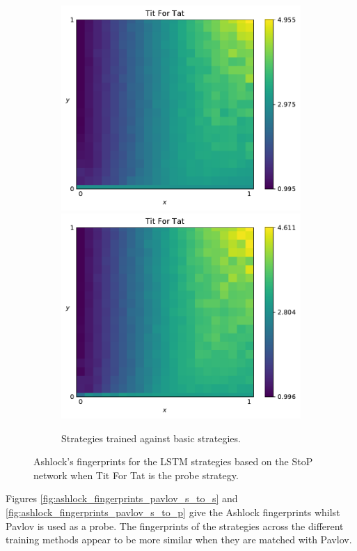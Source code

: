 \begin{figure}[!htbp]
\begin{subfigure}{\textwidth}
        \includegraphics[width=.3\textwidth]{src/chapters/07/img/tit_for_tat_basic_classification_1.pdf}
        \includegraphics[width=.3\textwidth]{src/chapters/07/img/tit_for_tat_basic_classification_0_78.pdf}
        \caption{Strategies trained against basic strategies.}
    \end{subfigure}
    \caption{Ashlock's fingerprints for the LSTM strategies based on the StoP
    network when Tit For Tat is the probe strategy.}\label{fig:ashlock_fingerprints_tft_s_to_p}
\end{figure}

Figures \ref{fig:ashlock_fingerprints_pavlov_s_to_s} and
\ref{fig:ashlock_fingerprints_pavlov_s_to_p} give the Ashlock fingerprints
whilst Pavlov is used as a probe. The fingerprints of the strategies across the
different training methods appear to be more similar when they are matched with
Pavlov.

